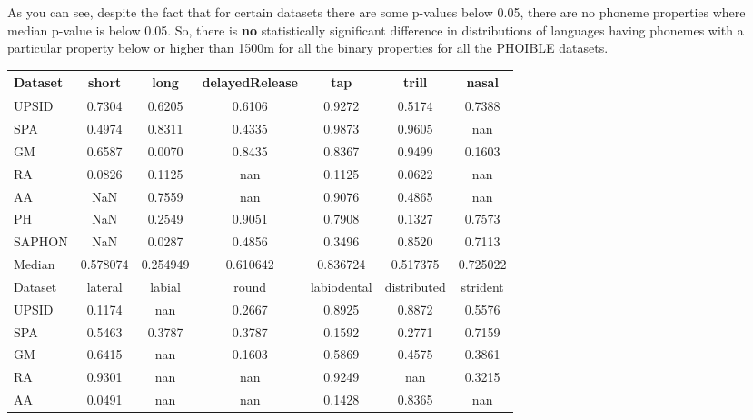 \documentclass[a4paper,12pt]{article}
\begin{document}
As you can see, despite the fact that for certain datasets there are some p-values below 0.05, there are no phoneme properties where median p-value is below 0.05. So, there is \textbf{no} statistically significant difference in distributions of languages having phonemes with a particular property below or higher than 1500m for all the binary properties for all the PHOIBLE datasets.

\noindent
\begin{minipage}{\textwidth}
\begin{adjustbox}{max width=\textwidth}
\begin{tabular}{ | l | c c c c c c |}
    \toprule
    Dataset &     short &      long & delayedRelease &       tap &     trill &     nasal \\
    \midrule
    UPSID &    0.7304 &    0.6205 &         0.6106 &    0.9272 &    0.5174 &    0.7388 \\
    SPA &    0.4974 &    0.8311 &         0.4335 &    0.9873 &    0.9605 &       nan \\
    GM &    0.6587 &    0.0070 &         0.8435 &    0.8367 &    0.9499 &    0.1603 \\
    RA &    0.0826 &    0.1125 &            nan &    0.1125 &    0.0622 &       nan \\
    AA &       NaN &    0.7559 &            nan &    0.9076 &    0.4865 &       nan \\
    PH &       NaN &    0.2549 &         0.9051 &    0.7908 &    0.1327 &    0.7573 \\
    SAPHON &       NaN &    0.0287 &         0.4856 &    0.3496 &    0.8520 &    0.7113 \\
    \midrule
    Median &  0.578074 &  0.254949 &       0.610642 &  0.836724 &  0.517375 &  0.725022 \\
    \bottomrule
    \toprule
    Dataset &   lateral &    labial &     round & labiodental & distributed & strident \\
    \midrule
    UPSID &    0.1174 &       nan &    0.2667 &      0.8925 &      0.8872 &   0.5576 \\
    SPA &    0.5463 &    0.3787 &    0.3787 &      0.1592 &      0.2771 &   0.7159 \\
    GM &    0.6415 &       nan &    0.1603 &      0.5869 &      0.4575 &   0.3861 \\
    RA &    0.9301 &       nan &       nan &      0.9249 &         nan &   0.3215 \\
    AA &    0.0491 &       nan &       nan &      0.1428 &      0.8365 &      nan \\

\end{tabular}
\end{adjustbox}
\end{minipage}
\end{document}

